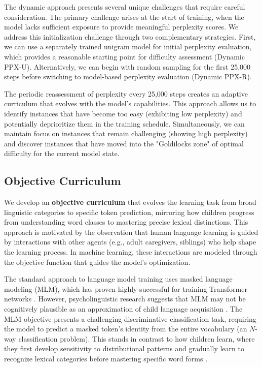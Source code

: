 \begin{enumerate}
    The dynamic approach presents several unique challenges that require careful consideration. The primary challenge arises at the start of training, when the model lacks sufficient exposure to provide meaningful perplexity scores. We address this initialization challenge through two complementary strategies. First, we can use a separately trained unigram model for initial perplexity evaluation, which provides a reasonable starting point for difficulty assessment (Dynamic PPX-U). Alternatively, we can begin with random sampling for the first 25,000 steps before switching to model-based perplexity evaluation (Dynamic PPX-R).

    The periodic reassessment of perplexity every 25,000 steps creates an adaptive curriculum that evolves with the model's capabilities. This approach allows us to identify instances that have become too easy (exhibiting low perplexity) and potentially deprioritize them in the training schedule. Simultaneously, we can maintain focus on instances that remain challenging (showing high perplexity) and discover instances that have moved into the "Goldilocks zone" of optimal difficulty for the current model state.

\end{enumerate}

\subsection{Objective Curriculum}
\label{subsec:objective-cl}

We develop an \textbf{objective curriculum} that evolves the learning task from broad linguistic categories to specific token prediction, mirroring how children progress from understanding word classes to mastering precise lexical distinctions. This approach is motivated by the observation that human language learning is guided by interactions with other agents (e.g., adult caregivers, siblings) who help shape the learning process. In machine learning, these interactions are modeled through the objective function that guides the model's optimization.

The standard approach to language model training uses masked language modeling (MLM), which has proven highly successful for training Transformer networks \cite{devlin2019bert}. However, psycholinguistic research suggests that MLM may not be cognitively plausible as an approximation of child language acquisition \cite{caucheteux2023evidence}. The MLM objective presents a challenging discriminative classification task, requiring the model to predict a masked token's identity from the entire vocabulary (an $N$-way classification problem). This stands in contrast to how children learn, where they first develop sensitivity to distributional patterns and gradually learn to recognize lexical categories before mastering specific word forms \cite{alishahi2010computational, gleitman1990structural}.

